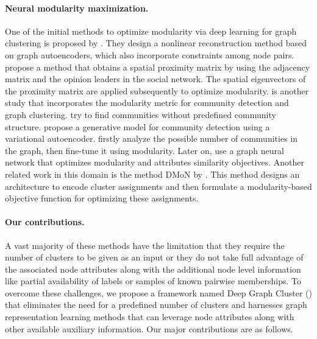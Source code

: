 \paragraph{Neural modularity maximization.} One of the initial methods to optimize modularity via deep learning for graph clustering is proposed by \citet{yang2016modularity}. They design a nonlinear reconstruction method based on graph autoencoders, which also incorporate constraints among node pairs. \citet{wu2020deep} propose a method that obtains a spatial proximity matrix by using the adjacency matrix and the opinion leaders in the social network. The spatial eigenvectors of the proximity matrix are applied subsequently to optimize modularity. \citet{mandaglio2018consensus} is another study that incorporates the modularity metric for community detection and graph clustering. \citet{choong2018learning, bhatia2018dfuzzy} try to find communities without predefined community structure. \citet{choong2018learning} propose a generative model for community detection using a variational autoencoder. \citet{bhatia2018dfuzzy} firstly analyze the possible number of communities in the graph, then fine-tune it using modularity. Later on, \citet{sun2021graph} use a graph neural network that optimizes modularity and attributes similarity objectives. Another related work in this domain is the method DMoN by \citet{muller2023graph}. This method designs an architecture to encode cluster assignments and then formulate a modularity-based objective function for optimizing these assignments.

\paragraph{Our contributions. } A vast majority of these methods have the limitation that they require the number of clusters to be given as an input or they do not take full advantage of the associated node attributes along with the additional node level information like partial availability of labels or samples of known pairwise memberships. To overcome these challenges, we propose a framework named Deep Graph Cluster ({\model}) that eliminates the need for a predefined number of clusters and harnesses graph representation learning methods that can leverage node attributes along with other available auxiliary information. Our major contributions are as follows.\\



